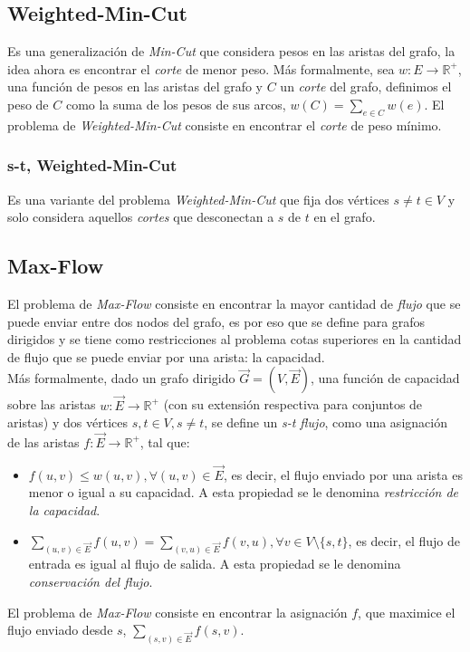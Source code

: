 \documentclass[dcc,uchile]{fcfmcourse}
\begin{document}
\subsection*{Weighted-Min-Cut}
Es una generalización de \textit{Min-Cut} que considera pesos en las aristas del grafo, la idea ahora es encontrar el \textit{corte} de menor peso. Más formalmente, sea $w:E\to \mathbb{R}^+$, una función de pesos en las aristas del grafo y $C$ un \textit{corte} del grafo, definimos el peso de $C$ como la suma de los pesos de sus arcos, $w(C) = \sum_{e\in C} w(e)$. El problema de \textit{Weighted-Min-Cut} consiste en encontrar el \textit{corte} de peso mínimo.

\subsubsection*{s-t, Weighted-Min-Cut}
Es una variante del problema  \textit{Weighted-Min-Cut} que fija dos vértices $s\not = t \in V$ y solo considera aquellos \textit{cortes} que desconectan a $s$ de $t$ en el grafo.

\subsection*{Max-Flow}
El problema de \textit{Max-Flow} consiste en encontrar la mayor cantidad de \textit{flujo} que se puede enviar entre dos nodos del grafo, es por eso que se define para grafos dirigidos y se tiene como restricciones al problema cotas superiores en la cantidad de flujo que se puede enviar por una arista: la capacidad.\\ Más formalmente, dado un grafo dirigido $\vec{G} = (V, \vec{E})$, una función de capacidad sobre las aristas $w:\vec{E}\to \mathbb{R}^+$ (con su extensión respectiva para conjuntos de aristas) y dos vértices $s,t\in V, s\not = t$, se define un \textit{s-t flujo}, como una asignación de las aristas $f:\vec{E}\to \mathbb{R}^+$, tal que:
\begin{itemize}
    \item $f(u,v)\le w(u,v), \forall (u,v) \in \vec{E}$, es decir, el flujo enviado por una arista es menor o igual a su capacidad. A esta propiedad se le denomina \textit{restricción de la capacidad}.
    \item $\sum_{(u,v) \in \vec{E}} f(u,v) = \sum_{(v,u) \in \vec{E}} f(v,u), \forall v \in V\setminus\{s,t\}$, es decir, el flujo de entrada es igual al flujo de salida. A esta propiedad se le denomina \textit{conservación del flujo}.
\end{itemize}
  El problema de \textit{Max-Flow} consiste en encontrar la asignación $f$, que maximice el flujo enviado desde $s$, $\sum_{(s,v)\in\vec{E}}f(s,v)$.
\end{document}

